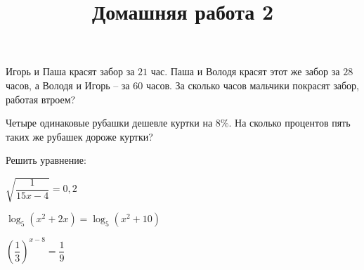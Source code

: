 \begin{listofex}
	\item Игорь и Паша красят забор за \( 21 \) час. Паша и Володя красят этот же забор за \( 28 \) часов, а Володя и Игорь – за \( 60 \) часов. За сколько часов мальчики покрасят забор, работая втроем?
	\item Четыре одинаковые рубашки дешевле куртки на \( 8\% \). На сколько процентов пять таких же рубашек дороже куртки?
	\item Решить уравнение:
	\begin{enumcols}[itemcolumns=2]
		\item \( \sqrt{\dfrac{1}{15x-4}}=0,2 \)
		\item \( \log_5(x^2+2x)=\log_5(x^2+10) \)
		\item \( \left( \dfrac{1}{3} \right)^{x-8}=\dfrac{1}{9} \)
	\end{enumcols}
\end{listofex}
%	
%	
\newpage
\title{Домашняя работа 2}
